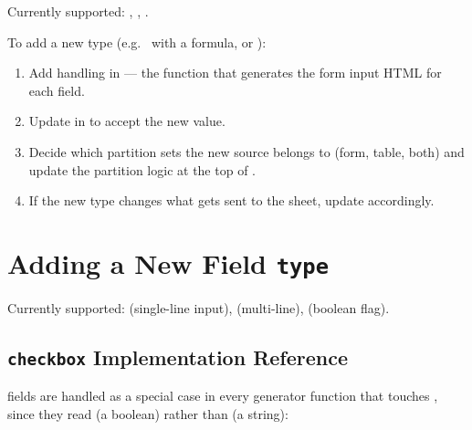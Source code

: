 Currently supported: , , .

To add a new type (e.g.\  with a formula, or ):

\begin{enumerate}
    \item Add handling in  --- the
          function that generates the form input HTML for each field.
    \item Update  in  to accept
          the new value.
    \item Decide which partition sets the new source belongs to (form, table,
          both) and update the partition logic at the top of
          .
    \item If the new type changes what gets sent to the sheet, update
           accordingly.
\end{enumerate}

\chapter{Adding a New Field \texttt{type}}

Currently supported:  (single-line input), 
(multi-line),  (boolean flag).

\section{\texttt{checkbox} Implementation Reference}

 fields are handled as a special case in every generator
function that touches , since they read  (a
boolean) rather than  (a string):

